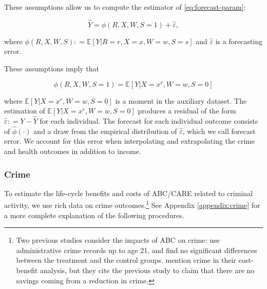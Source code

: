These assumptions allow us to compute the estimator of \eqref{eq:forecast-param}: 

\begin{equation}
\widehat{Y} = \widehat{\phi} \left( R, X, W, S = 1 \right) + \widehat{\varepsilon},   \label{eq:additive}
\end{equation}

\noindent where $\phi \left( R, X, W, S \right) : = \mathbb{E} \left[ Y | R = r, X = x, W = w, S = s \right] $ and $\widehat{\varepsilon}$ is a forecasting error. 

These assumptions imply that

\begin{equation}
\phi \left( R, X, W, S = 1 \right) = \mathbb{E} \left[ Y | X = x^r, W = w, S = 0 \right]
\end{equation}

\noindent where $\mathbb{E} \left[ Y | X = x^r, W = w, S = 0 \right]$ is a moment in the auxiliary dataset. The estimation of $\mathbb{E} \left[ Y | X = x^r, W = w, S = 0 \right]$ produces a residual of the form $\widehat{\varepsilon} : = Y - \widehat{Y}$ for each individual. The forecast for each  individual outcome consists of $\widehat{\phi} \left( \cdot \right)$ and a draw from the empirical distribution of $\widehat{\varepsilon}$, which we call forecast error. We account for this error when interpolating and extrapolating the crime and health outcomes in addition to income.

\subsubsection{Crime}  \label{sec:crime}

To estimate the life-cycle benefits and costs of ABC/CARE related to criminal activity, we use rich data on crime outcomes.\footnote{Two previous studies consider the impacts of ABC on crime: \citet{Clarke_Campbell_1998_ABC_Comparison_ECRQ} use administrative crime records up to age 21, and find no significant differences between the treatment and the control groups. \cite{Barnett_Masse_2007_EER} mention crime in their cost-benefit analysis, but they cite the previous study to claim that there are no savings coming from a reduction in crime.} See Appendix \ref{appendix:crime} for a more complete explanation of the following procedures.

